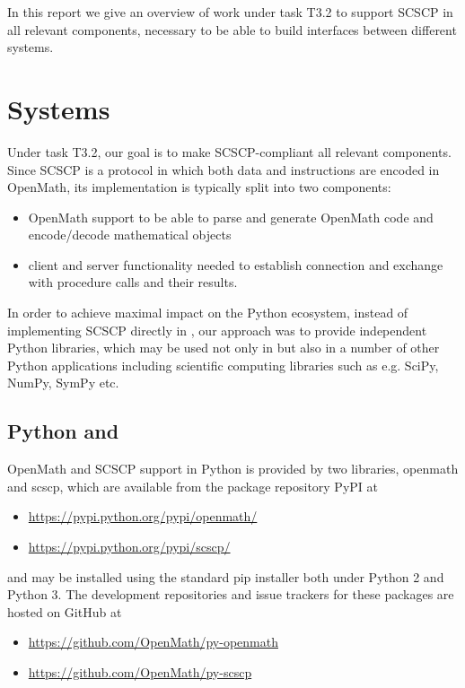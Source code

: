 \documentclass{deliverablereport}
\begin{document}
In this report we give an overview of work under  task T3.2 
to support SCSCP in all relevant components, necessary to be able
to build interfaces between different systems. 


\section{Systems}\label{systems}

Under task T3.2, our goal is to make SCSCP-compliant all
relevant components. Since SCSCP is a protocol in which 
both data and instructions are encoded in OpenMath, its
implementation is typically split into two components: 
\begin{itemize}
\item OpenMath support to be able to parse and 
generate OpenMath code and encode/decode mathematical objects
\item client and server functionality needed to establish connection
and exchange with procedure calls and their results.
\end{itemize}

In order to achieve maximal impact on the Python ecosystem, 
instead of implementing SCSCP directly in \Sage, our approach
was to provide independent Python libraries, which may be used not
only in \Sage but also in a number of other Python applications
including scientific computing libraries such as e.g. 
SciPy, NumPy, SymPy etc.



\subsection{Python and \Sage}

OpenMath and SCSCP support in Python is provided by two libraries,
{\sf openmath} and {\sf scscp}, which are available from the package
repository PyPI at
\begin{itemize}
\item \url{https://pypi.python.org/pypi/openmath/}
\item \url{https://pypi.python.org/pypi/scscp/}
\end{itemize}
and may be installed using 
the standard {\sf pip} installer both under Python 2 and Python 3. The
development repositories and issue trackers for these packages are
hosted on GitHub at 
\begin{itemize}
\item \url{https://github.com/OpenMath/py-openmath}
\item \url{https://github.com/OpenMath/py-scscp}
\end{itemize}
\end{document}

